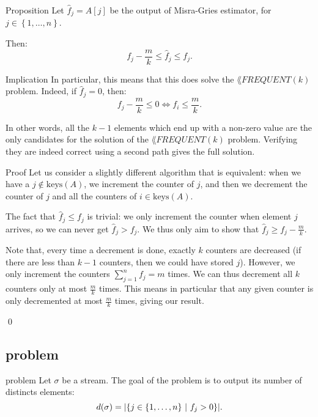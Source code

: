 \documentclass[a4paper]{article}
\begin{document}
\begin{parag}{Proposition}
    Let $\hat{f}_j = A\left[j\right]$ be the output of Misra-Gries estimator, for $j \in \left\{1, \ldots, n\right\}$.

    Then: 
    \[f_j - \frac{m}{k} \leq \hat{f}_j \leq f_j.\]

    \begin{subparag}{Implication}
        In particular, this means that this does solve the $\lang{FREQUENT}\left(k\right)$ problem. Indeed, if $\hat{f}_j = 0$, then:
        \[f_j - \frac{m}{k} \leq 0 \iff f_i \leq \frac{m}{k}.\]

        In other words, all the $k-1$ elements which end up with a non-zero value are the only candidates for the solution of the $\lang{FREQUENT}\left(k\right)$ problem. Verifying they are indeed correct using a second path gives the full solution.
    \end{subparag}

    \begin{subparag}{Proof}
        Let us consider a slightly different algorithm that is equivalent: when we have a $j \not \in \text{keys}\left(A\right)$, we increment the counter of $j$, and then we decrement the counter of $j$ and all the counters of $i \in \text{keys}\left(A\right)$. 

        The fact that $\hat{f}_j \leq f_j$ is trivial: we only increment the counter when element $j$ arrives, so we can never get $\hat{f}_j > f_j$. We thus only aim to show that $\hat{f}_j \geq f_j - \frac{m}{k}$.

        Note that, every time a decrement is done, exactly $k$ counters are decreased (if there are less than $k - 1$ counters, then we could have stored $j$). However, we only increment the counters $\sum_{j=1}^{n} f_j = m$ times. We can thus decrement all $k$ counters only at most $\frac{m}{k}$ times. This means in particular that any given counter is only decremented at most $\frac{m}{k}$ times, giving our result.

        \qed
    \end{subparag}
\end{parag}

\subsection{ problem}

\begin{parag}{  problem}
    Let $\sigma$ be a stream. The goal of the  problem is to output its number of distincts elements: 
    \[d\left(\sigma\right) = \left|\left\{j \in \left\{1, \ldots, n\right\} \suchthat f_j > 0\right\}\right|.\]
\end{parag}
\end{document}
